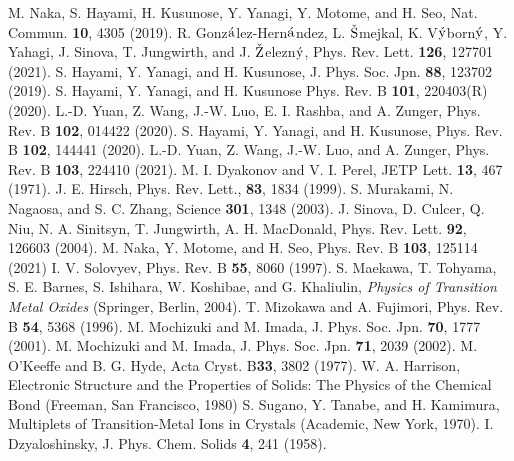 \documentclass[aps,twocolumn,prb,preprintnumbers,amsmath,amssymb]{revtex4-2}
\begin{document}
\begin{thebibliography}{99}
%
M. Naka, S. Hayami, H. Kusunose, Y. Yanagi, Y. Motome, and H. Seo, 
Nat. Commun. {\bf 10}, 4305 (2019).
%
R. Gonz$\acute{\rm a}$lez-Hern$\acute{\rm a}$ndez, L. $\check{\rm S}$mejkal, K. V$\acute{\rm y}$born$\acute{\rm y}$, Y. Yahagi, J. Sinova, T. Jungwirth, and J. $\check{\rm Z}$elezn$\acute{\rm y}$, 
Phys. Rev. Lett. {\bf 126}, 127701 (2021).
%
S. Hayami, Y. Yanagi, and H. Kusunose, 
J. Phys. Soc. Jpn. {\bf 88}, 123702 (2019).
%
S. Hayami, Y. Yanagi, and H. Kusunose
Phys. Rev. B {\bf 101}, 220403(R) (2020).
%
L.-D. Yuan, Z. Wang, J.-W. Luo, E. I. Rashba, and A. Zunger, 
Phys. Rev. B {\bf 102}, 014422 (2020).
%
S. Hayami, Y. Yanagi, and H. Kusunose, 
Phys. Rev. B {\bf 102}, 144441 (2020).
%
L.-D. Yuan, Z. Wang, J.-W. Luo, and A. Zunger, 
Phys. Rev. B {\bf 103}, 224410 (2021).
%
M. I. Dyakonov and V. I. Perel, 
JETP Lett. {\bf 13}, 467 (1971).
%
J. E. Hirsch, 
Phys. Rev. Lett., {\bf 83}, 1834 (1999).
%
S. Murakami, N. Nagaosa, and S. C. Zhang, 
Science {\bf 301}, 1348 (2003).
%
J. Sinova, D. Culcer, Q. Niu, N. A. Sinitsyn, T. Jungwirth, A. H. MacDonald, 
Phys. Rev. Lett. {\bf 92}, 126603 (2004). 
%
M. Naka, Y. Motome, and H. Seo, 
Phys. Rev. B {\bf 103}, 125114 (2021)
%
I. V. Solovyev, 
Phys. Rev. B {\bf 55}, 8060 (1997).
%
S. Maekawa, T. Tohyama, S. E. Barnes, S. Ishihara, W. Koshibae, and G. Khaliulin, 
{\it Physics of Transition Metal Oxides} (Springer, Berlin, 2004).
%
T. Mizokawa and A. Fujimori, 
Phys. Rev. B {\bf 54}, 5368 (1996).
%
M. Mochizuki and M. Imada, 
J. Phys. Soc. Jpn. {\bf 70}, 1777 (2001).
%
M. Mochizuki and M. Imada, 
J. Phys. Soc. Jpn. {\bf 71}, 2039 (2002).
%
M. O'Keeffe and B. G. Hyde, 
Acta Cryst. B{\bf 33}, 3802 (1977).
%
W. A. Harrison, 
Electronic Structure and the Properties of Solids: The Physics of the Chemical Bond (Freeman, San Francisco, 1980)
%
S. Sugano, Y. Tanabe, and H. Kamimura, 
Multiplets of Transition-Metal Ions in Crystals (Academic, New York, 1970).
%
I. Dzyaloshinsky, J. Phys. Chem. Solids {\bf 4}, 241 (1958).
%

\end{thebibliography}
\end{document}
